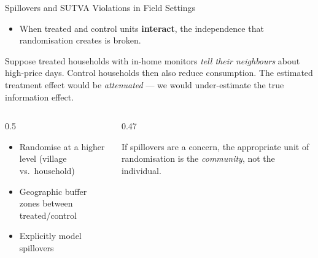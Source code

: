 \documentclass[aspectratio=169, 11pt]{beamer}
\begin{document}
\begin{frame}[t]{Spillovers and SUTVA Violations in Field Settings}
\begin{itemize}
  \setlength\itemsep{0.5em}
  \item When treated and control units \textbf{interact}, the independence that
        randomisation creates is broken.
\end{itemize}
\vspace{0.3em}
\begin{warningbox}
  Suppose treated households with in-home monitors \emph{tell their neighbours}
  about high-price days. Control households then also reduce consumption.
  The estimated treatment effect would be \emph{attenuated} — we would
  under-estimate the true information effect.
\end{warningbox}
\vspace{0.3em}
\begin{columns}[T]
\begin{column}{0.5\textwidth}
  \begin{keybox}[Solutions]
    \small
    \begin{itemize}
      \item Randomise at a higher level (village vs.\ household)
      \item Geographic buffer zones between treated/control
      \item Explicitly model spillovers
    \end{itemize}
  \end{keybox}
\end{column}
\begin{column}{0.47\textwidth}
  \begin{intuitionbox}
    \small
    If spillovers are a concern, the appropriate unit of randomisation
    is the \emph{community}, not the individual.
  \end{intuitionbox}
\end{column}
\end{columns}
\end{frame}
\end{document}
